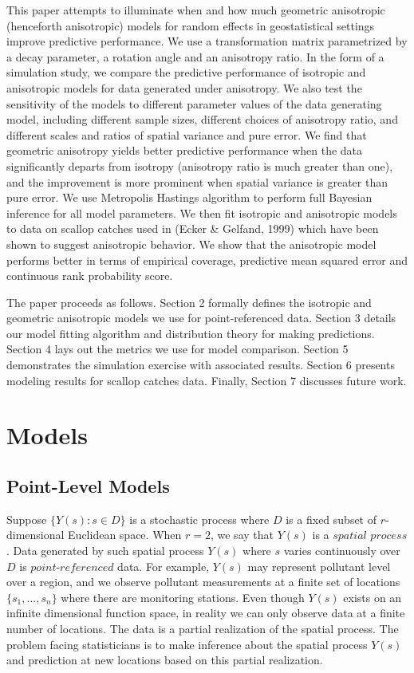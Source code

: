 \documentclass[12pt,twoside]{dukestatscithesis}
\theoremstyle{definition}
\theoremstyle{definition}
\theoremstyle{definition}
\theoremstyle{remark}
\begin{document}
This paper attempts to illuminate when and how much geometric
anisotropic (henceforth anisotropic) models for random effects in
geostatistical settings improve predictive performance. We use a
transformation matrix parametrized by a decay parameter, a rotation
angle and an anisotropy ratio. In the form of a simulation study, we
compare the predictive performance of isotropic and anisotropic models
for data generated under anisotropy. We also test the sensitivity of the
models to different parameter values of the data generating model,
including different sample sizes, different choices of anisotropy ratio,
and different scales and ratios of spatial variance and pure error. We
find that geometric anisotropy yields better predictive performance when
the data significantly departs from isotropy (anisotropy ratio is much
greater than one), and the improvement is more prominent when spatial
variance is greater than pure error. We use Metropolis Hastings
algorithm to perform full Bayesian inference for all model parameters.
We then fit isotropic and anisotropic models to data on scallop catches
used in (Ecker \& Gelfand, 1999) which have been shown to suggest
anisotropic behavior. We show that the anisotropic model performs better
in terms of empirical coverage, predictive mean squared error and
continuous rank probability score.

The paper proceeds as follows. Section 2 formally defines the isotropic
and geometric anisotropic models we use for point-referenced data.
Section 3 details our model fitting algorithm and distribution theory
for making predictions. Section 4 lays out the metrics we use for model
comparison. Section 5 demonstrates the simulation exercise with
associated results. Section 6 presents modeling results for scallop
catches data. Finally, Section 7 discusses future work.

\chapter{Models}\label{models}

\section{Point-Level Models}\label{point-level-models}

Suppose \(\{Y(s): s \in D\}\) is a stochastic process where \(D\) is a
fixed subset of \(r\)-dimensional Euclidean space. When \(r=2\), we say
that \(Y(s)\) is a \(\textit{spatial process}\). Data generated by such
spatial process \(Y(s)\) where \(s\) varies continuously over \(D\) is
\(\textit{point-referenced}\) data. For example, \(Y(s)\) may represent
pollutant level over a region, and we observe pollutant measurements at
a finite set of locations\(\{s_1, ..., s_n\}\) where there are
monitoring stations. Even though \(Y(s)\) exists on an infinite
dimensional function space, in reality we can only observe data at a
finite number of locations. The data is a partial realization of the
spatial process. The problem facing statisticians is to make inference
about the spatial process \(Y(s)\) and prediction at new locations based
on this partial realization.
\end{document}
